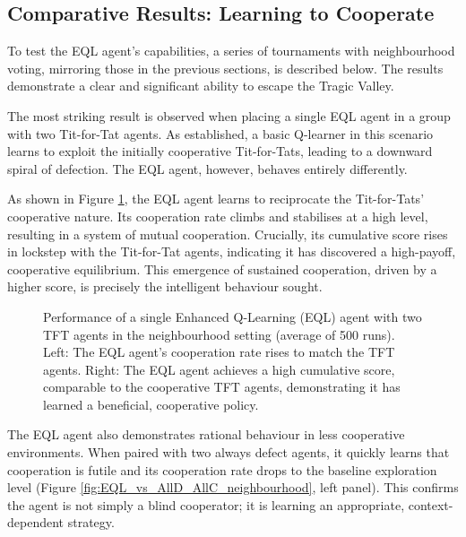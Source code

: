\documentclass[]{llncs} %
\begin{document}
\subsection{Comparative Results: Learning to Cooperate}

To test the EQL agent's capabilities, a series of tournaments with
neighbourhood voting, mirroring those in the previous sections, is
described below. The results demonstrate a clear and significant
ability to escape the Tragic Valley.

The most striking result is observed when placing a single EQL agent
in a group with two Tit-for-Tat agents. As established, a basic
Q-learner in this scenario learns to exploit the initially
cooperative Tit-for-Tats, leading to a downward spiral of defection. The EQL
agent, however, behaves entirely differently.

As shown in Figure \ref{fig:EQL_vs_TFT_neighbourhood}, the EQL agent
learns to reciprocate the Tit-for-Tats' cooperative nature. Its cooperation
rate climbs and stabilises at a high level, resulting in a system of
mutual cooperation. Crucially, its cumulative score rises in lockstep
with the Tit-for-Tat agents, indicating it has discovered a high-payoff,
cooperative equilibrium. This emergence of sustained cooperation,
driven by a higher score, is precisely the intelligent behaviour sought.


\begin{figure}[ht]
    \centering
    \caption{Performance of a single Enhanced Q-Learning (EQL) agent with two TFT agents in the neighbourhood setting (average of 500 runs). Left: The EQL agent's cooperation rate rises to match the TFT agents. Right: The EQL agent achieves a high cumulative score, comparable to the cooperative TFT agents, demonstrating it has learned a beneficial, cooperative policy.}
    \label{fig:EQL_vs_TFT_neighbourhood}
\end{figure}

The EQL agent also demonstrates rational behaviour in less cooperative
environments. When paired with two always defect agents, it
quickly learns that cooperation is futile and its cooperation rate
drops to the baseline exploration level (Figure
\ref{fig:EQL_vs_AllD_AllC_neighbourhood}, left panel). This confirms
the agent is not simply a blind cooperator; it is learning an
appropriate, context-dependent strategy.
\end{document}
